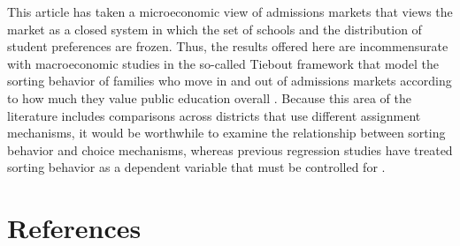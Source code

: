 \documentclass[12pt]{article}
\numberwithin{equation}{subsection}
\theoremstyle{definition}
\begin{document}
This article has taken a microeconomic view of admissions markets that views the market as a closed system in which the set of schools and the distribution of student preferences are frozen. Thus, the results offered here are incommensurate with macroeconomic studies in the so-called Tiebout framework that model the sorting behavior of families who move in and out of admissions markets according to how much they value public education overall \parencite[][]{apuretheoryoflocalexpenditures, equilibriumandlocalredistribution}. Because this area of the literature includes comparisons across districts that use different assignment mechanisms, it would be worthwhile to examine the relationship between sorting behavior and choice mechanisms, whereas previous regression studies have treated sorting behavior as a dependent variable that must be controlled for \parencite[][]{doescompetitionamongpublicschools}.

\pagebreak
\section{References}
\printbibliography[heading=none]
\end{document}
